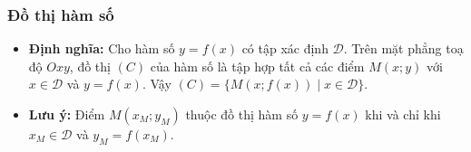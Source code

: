 \subsubsection{Đồ thị hàm số}
\begin{itemize}
	\item [\faSunO] \textbf{Định nghĩa:} Cho hàm số $y=f(x)$ có tập xác định $\mathscr{D}$. Trên mặt phẳng toạ độ $Oxy$, đồ thị $(C)$ của hàm số là tập hợp tất cả các điểm $M(x;y)$ với $x \in \mathscr{D}$ và $y=f(x)$. Vậy $(C)=\{M(x;f(x)) \mid x \in \mathscr{D}\}$.
	\item [\faSunO] \textbf{Lưu ý:} Điểm $M\left(x_{M};y_{M}\right)$ thuộc đồ thị hàm số $y=f(x)$ khi và chỉ khi $x_{M} \in \mathscr{D}$ và $y_{M}=f\left(x_{M}\right)$.
\end{itemize}
